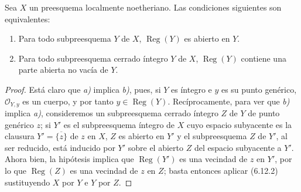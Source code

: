 \begin{corollary}[6.12.3]
\label{IV.2.s6.12.3-fr}
Sea $X$ un preesquema localmente noetheriano. Las condiciones siguientes son
equivalentes:
\begin{enumerate}
\item[\textup{a)}] Para todo subpreesquema $Y$ de $X$,
$\operatorname{Reg}(Y)$ es abierto en $Y$.


\item[\textup{b)}] Para todo subpreesquema cerrado íntegro $Y$ de $X$,
$\operatorname{Reg}(Y)$ contiene una parte abierta no vacía de $Y$.
\end{enumerate}
\end{corollary}

\begin{proof}
Está claro que \emph{a)} implica \emph{b)}, pues, si $Y$ es íntegro e $y$ es su punto
genérico, $\mathcal O_{Y,y}$ es un cuerpo, y por tanto
$y\in\operatorname{Reg}(Y)$. Recíprocamente, para ver que \emph{b)} implica \emph{a)},
consideremos un subpreesquema cerrado íntegro $Z$ de $Y$ de punto genérico
$z$; si $Y'$ es el subpreesquema íntegro de $X$ cuyo espacio subyacente es la
clausura $Y'=\overline{\{z\}}$ de $z$ en $X$, $Z$ es abierto en $Y'$ y el
subpreesquema $Z$ de $Y'$, al ser reducido, está inducido por $Y'$ sobre el
abierto $Z$ del espacio subyacente a $Y'$. Ahora bien, la hipótesis implica
que $\operatorname{Reg}(Y')$ es una vecindad de $z$ en $Y'$, por lo que
$\operatorname{Reg}(Z)$ es una vecindad de $z$ en $Z$; basta entonces aplicar
(6.12.2) sustituyendo $X$ por $Y$ e $Y$ por $Z$.
\end{proof}
